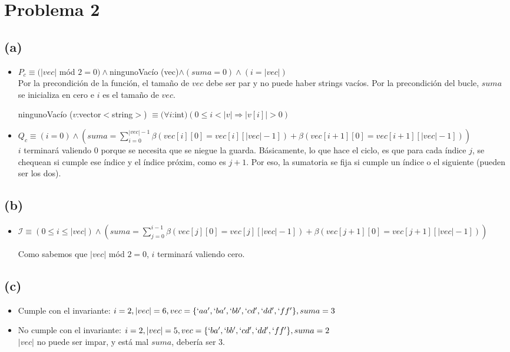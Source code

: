 \documentclass[10 pt]{article}
\begin{document}
    \section*{Problema 2}
        \subsection*{(a)}
            \begin{itemize}
                \item $P_{c} \equiv (|vec|$ mód $2 = 0) \wedge $ningunoVacío (vec)$ \wedge (suma = 0) \wedge (i = |vec|)$ 
                \\
                Por la precondición de la función, el tamaño de $vec$ debe ser par y no puede haber strings vacíos. Por la precondición del bucle, $suma$ se inicializa en cero e $i$ es el tamaño de $vec$.

                ningunoVacío ($v$:vector$<$string$>$) $\equiv (\forall i$:int$)(0 \leq i < |v| \Rightarrow |v[i]| > 0)$
                \item $Q_{c} \equiv (i = 0) \wedge (suma = \sum^{|vec|-1}_{i=0}\beta(vec[i][0] = vec[i][|vec|-1])+\beta(vec[i+1][0] = vec[i+1][|vec|-1]))$
                \\
                $i$ terminará valiendo 0 porque se necesita que se niegue la guarda. Básicamente, lo que hace el ciclo, es que para cada índice $j$, se chequean si cumple ese índice y el índice próxim, como es $j+1$. Por eso, la sumatoria se fija si cumple un índice o el siguiente (pueden ser los dos).
            \end{itemize}
        \subsection*{(b)}
            \begin{itemize}
                \item $\mathcal{I} \equiv (0 \leq i \leq |vec|) \wedge (suma = \sum^{i-1}_{j=0}\beta(vec[j][0] = vec[j][|vec|-1])+\beta(vec[j+1][0] = vec[j+1][|vec|-1]))$
                
                Como sabemos que $|vec|$ mód $2 = 0$, $i$ terminará valiendo cero. 
            \end{itemize}
        \subsection*{(c)}
            \begin{itemize}
                \item Cumple con el invariante: $i = 2, |vec| = 6, vec = \{`aa', `ba', `bb', `cd', `dd', `ff'\}, suma = 3$
                \item No cumple con el invariante: $i = 2, |vec| = 5, vec = \{`ba', `bb', `cd', `dd', `ff'\}, suma = 2$
                \\
                $|vec|$ no puede ser impar, y está mal $suma$, debería ser 3.
            \end{itemize}
\end{document}
